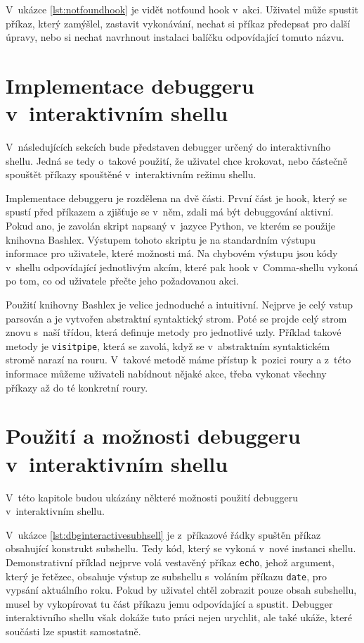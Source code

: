 \documentclass[thesis=M,czech]{FITthesis}[2012/06/26]
\begin{document}
V~ukázce \ref{lst:notfoundhook} je vidět notfound hook v~akci. Uživatel může spustit příkaz, který zamýšlel, zastavit vykonávání, nechat si příkaz předepsat pro další úpravy,  nebo si nechat navrhnout instalaci balíčku odpovídající tomuto názvu.

%
%
%
%
%
\section{Implementace debuggeru v~interaktivním shellu}

V~následujících sekcích bude představen debugger určený do interaktivního shellu. Jedná se tedy o~takové použití, že uživatel chce krokovat, nebo částečně spouštět příkazy spouštěné v~interaktivním režimu shellu.

Implementace debuggeru je rozdělena na dvě části. První část je hook, který se spustí před příkazem a zjišťuje se v~něm, zdali má být debuggování aktivní. Pokud ano, je zavolán skript napsaný v~jazyce Python, ve kterém se použije knihovna Bashlex. Výstupem tohoto skriptu je na standardním výstupu informace pro uživatele, které možnosti má. Na chybovém výstupu jsou kódy v~shellu odpovídající jednotlivým akcím, které pak hook v~Comma-shellu vykoná po tom, co od uživatele přečte jeho požadovanou akci.

Použití knihovny Bashlex je velice jednoduché a intuitivní. Nejprve je celý vstup parsován a je vytvořen abstraktní syntaktický strom. Poté se projde celý strom znovu s~naší třídou, která definuje metody pro jednotlivé uzly. Příklad takové metody je \texttt{visitpipe}, která se zavolá, když se v~abstraktním syntaktickém stromě narazí na rouru. V~takové metodě máme přístup k~pozici roury a z~této informace můžeme uživateli nabídnout nějaké akce, třeba vykonat všechny příkazy až do té konkretní roury.


\section{Použití a možnosti debuggeru v~interaktivním shellu}

V~této kapitole budou ukázány některé možnosti použití debuggeru v~interaktivním shellu.

V~ukázce \ref{lst:dbginteractivesubhsell} je z~příkazové řádky spuštěn příkaz obsahující konstrukt subshellu. Tedy kód, který se vykoná v~nové instanci shellu. Demonstrativní příklad nejprve volá vestavěný příkaz \texttt{echo}, jehož argument, který je řetězec, obsahuje výstup ze subshellu s~voláním příkazu \texttt{date}, pro vypsání aktuálního roku. Pokud by uživatel chtěl zobrazit pouze obsah subshellu, musel by vykopírovat tu část příkazu jemu odpovídající a spustit. Debugger interaktivního shellu však dokáže tuto práci nejen urychlit, ale také ukáže, které součásti lze spustit samostatně.
\end{document}
